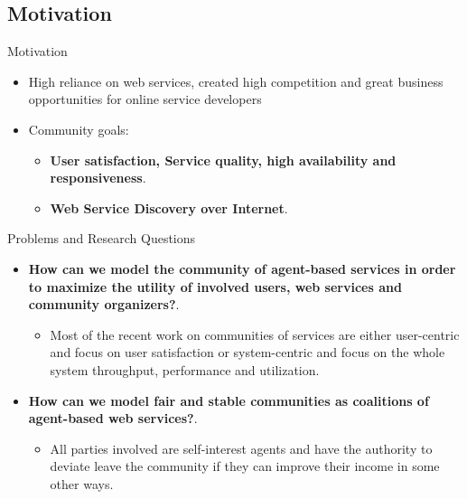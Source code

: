 \documentclass{beamer}
\begin{document}
\subsection{Motivation}
    \begin{frame}{Motivation}
    \begin{itemize}
        \item High reliance on web services, created high competition and great business opportunities for online service developers
        \item Community goals:
        \begin{itemize}
            \item \textbf{User satisfaction, Service quality, high availability and responsiveness}.
            \item \textbf{Web Service Discovery over Internet}.
        \end{itemize}
    \end{itemize}
    \begin{figure}[htbp]
        \centering
    \end{figure}
    \end{frame}
\begin{frame}{Problems and Research Questions}

\begin{itemize}
    \item \textbf{How can we model the
        community of agent-based services in order to maximize the utility
        of involved users, web services and community organizers?}.
        \begin{itemize}
            \item Most of the recent work on communities of
            services are either user-centric and focus on user satisfaction
            or system-centric and focus on the whole system throughput, performance and utilization.
        \end{itemize}


    \item \textbf{How can we model fair and stable communities as coalitions
        of agent-based web services?}.
        \begin{itemize}
            \item All parties involved are self-interest agents and have the authority to deviate leave the community if they can improve their income in some other ways.
        \end{itemize}

\end{itemize}

\end{frame}
\end{document}
